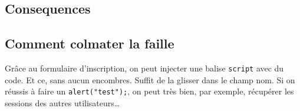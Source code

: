 \documentclass[oneside,10pt]{article}
\begin{document}
\subsection{Consequences}
\subsection{Comment colmater la faille}
Gr\^ace au formulaire d'inscription, on peut injecter une balise \verb+script+ avec du code.
Et ce, sans aucun encombres.
Suffit de la glisser dans le champ nom.
Si on r\'eussis \`a faire un \verb+alert("test");+, on peut tr\`es bien, par exemple, r\'ecup\'erer les sessions des autres utilisateurs\ldots
\end{document}

